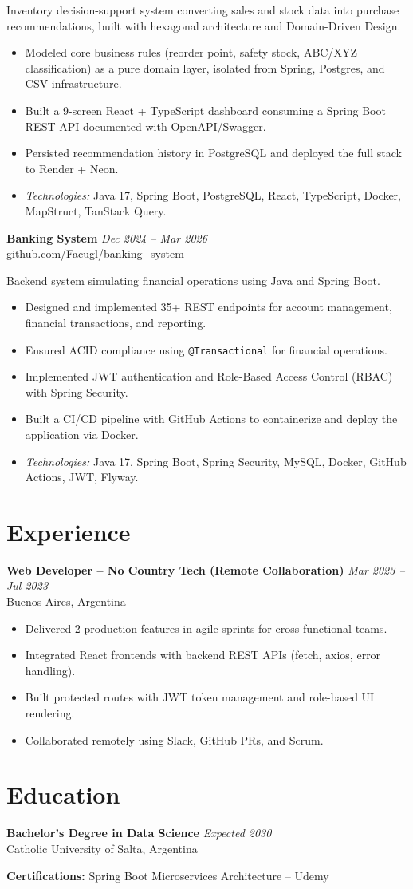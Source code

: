 \documentclass[11pt,a4paper]{article}
\newcommand{\entry}[3]{%
  \noindent\textbf{#1} \hfill \textit{#2} \\
  #3
}
\begin{document}
\noindent Inventory decision-support system converting sales and stock data into purchase recommendations, built with hexagonal architecture and Domain-Driven Design.
\begin{itemize}
  \item Modeled core business rules (reorder point, safety stock, ABC/XYZ classification) as a pure domain layer, isolated from Spring, Postgres, and CSV infrastructure.
  \item Built a 9-screen React + TypeScript dashboard consuming a Spring Boot REST API documented with OpenAPI/Swagger.
  \item Persisted recommendation history in PostgreSQL and deployed the full stack to Render + Neon.
  \item \textit{Technologies:} Java 17, Spring Boot, PostgreSQL, React, TypeScript, Docker, MapStruct, TanStack Query.
\end{itemize}

\vspace{5pt}
\entry{Banking System}{Dec 2024 -- Mar 2026}{\href{https://github.com/Facugl/banking_system}{github.com/Facugl/banking\_system}}
\vspace{3pt}

\noindent Backend system simulating financial operations using Java and Spring Boot.
\begin{itemize}
  \item Designed and implemented 35+ REST endpoints for account management, financial transactions, and reporting.
  \item Ensured ACID compliance using \texttt{@Transactional} for financial operations.
  \item Implemented JWT authentication and Role-Based Access Control (RBAC) with Spring Security.
  \item Built a CI/CD pipeline with GitHub Actions to containerize and deploy the application via Docker.
  \item \textit{Technologies:} Java 17, Spring Boot, Spring Security, MySQL, Docker, GitHub Actions, JWT, Flyway.
\end{itemize}

\section*{Experience}
\entry{Web Developer -- No Country Tech (Remote Collaboration)}{Mar 2023 -- Jul 2023}{Buenos Aires, Argentina}
\vspace{1pt}
\begin{itemize}
  \item Delivered 2 production features in agile sprints for cross-functional teams.
  \item Integrated React frontends with backend REST APIs (fetch, axios, error handling).
  \item Built protected routes with JWT token management and role-based UI rendering.
  \item Collaborated remotely using Slack, GitHub PRs, and Scrum.
\end{itemize}

\section*{Education}
\entry{Bachelor's Degree in Data Science}{Expected 2030}{Catholic University of Salta, Argentina}

\vspace{4pt}
\noindent\textbf{Certifications:} Spring Boot Microservices Architecture -- Udemy
\end{document}
